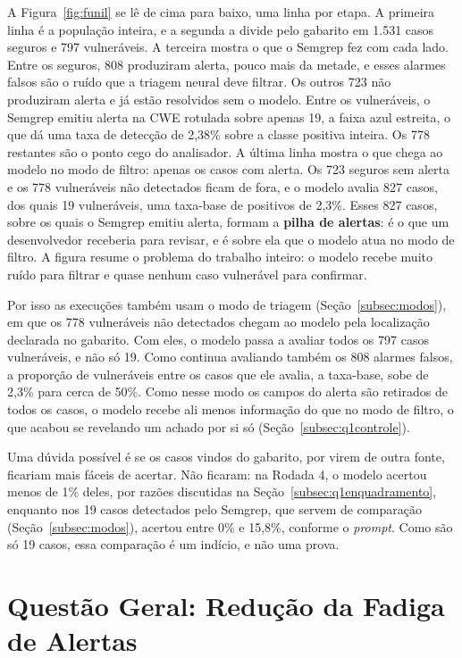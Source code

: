 A Figura~\ref{fig:funil} se lê de cima para baixo, uma linha por etapa. A primeira linha é a população inteira, e a segunda a divide pelo gabarito em 1.531 casos seguros e 797 vulneráveis. A terceira mostra o que o Semgrep fez com cada lado. Entre os seguros, 808 produziram alerta, pouco mais da metade, e esses alarmes falsos são o ruído que a triagem neural deve filtrar. Os outros 723 não produziram alerta e já estão resolvidos sem o modelo. Entre os vulneráveis, o Semgrep emitiu alerta na CWE rotulada sobre apenas 19, a faixa azul estreita, o que dá uma taxa de detecção de 2,38\% sobre a classe positiva inteira. Os 778 restantes são o ponto cego do analisador. A última linha mostra o que chega ao modelo no modo de filtro: apenas os casos com alerta. Os 723 seguros sem alerta e os 778 vulneráveis não detectados ficam de fora, e o modelo avalia 827 casos, dos quais 19 vulneráveis, uma taxa-base de positivos de 2,3\%. Esses 827 casos, sobre os quais o Semgrep emitiu alerta, formam a \textbf{pilha de alertas}: é o que um desenvolvedor receberia para revisar, e é sobre ela que o modelo atua no modo de filtro. A figura resume o problema do trabalho inteiro: o modelo recebe muito ruído para filtrar e quase nenhum caso vulnerável para confirmar.

Por isso as execuções também usam o modo de triagem (Seção~\ref{subsec:modos}), em que os 778 vulneráveis não detectados chegam ao modelo pela localização declarada no gabarito. Com eles, o modelo passa a avaliar todos os 797 casos vulneráveis, e não só 19. Como continua avaliando também os 808 alarmes falsos, a proporção de vulneráveis entre os casos que ele avalia, a taxa-base, sobe de 2,3\% para cerca de 50\%. Como nesse modo os campos do alerta são retirados de todos os casos, o modelo recebe ali menos informação do que no modo de filtro, o que acabou se revelando um achado por si só (Seção~\ref{subsec:q1controle}).

Uma dúvida possível é se os casos vindos do gabarito, por virem de outra fonte, ficariam mais fáceis de acertar. Não ficaram: na Rodada 4, o modelo acertou menos de 1\% deles, por razões discutidas na Seção~\ref{subsec:q1enquadramento}, enquanto nos 19 casos detectados pelo Semgrep, que servem de comparação (Seção~\ref{subsec:modos}), acertou entre 0\% e 15,8\%, conforme o \textit{prompt}. Como são só 19 casos, essa comparação é um indício, e não uma prova.

\section{Questão Geral: Redução da Fadiga de Alertas}
\label{sec:geral}

